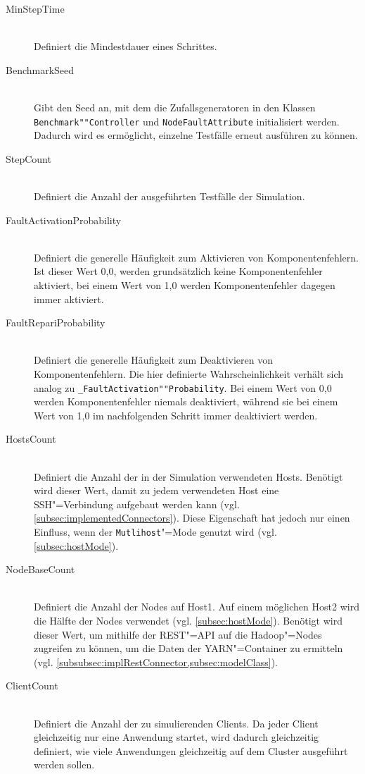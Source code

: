 \begin{description}
    \item [MinStepTime] \hfill \\
        Definiert die Mindestdauer eines Schrittes.
        
    \item[BenchmarkSeed] \hfill \\
        Gibt den Seed an, mit dem die Zufallsgeneratoren in den Klassen \texttt{Benchmark""Controller} und \texttt{NodeFaultAttribute} initialisiert werden.
        Dadurch wird es ermöglicht, einzelne Testfälle erneut ausführen zu können.
        
    \item[StepCount] \hfill \\
        Definiert die Anzahl der ausgeführten Testfälle der Simulation.
        
    \item[FaultActivationProbability] \hfill \\
        Definiert die generelle Häufigkeit zum Aktivieren von Komponentenfehlern.
        Ist dieser Wert 0,0, werden grundsätzlich keine Komponentenfehler aktiviert, bei einem Wert von 1,0 werden Komponentenfehler dagegen immer aktiviert.
        
    \item[FaultRepariProbability] \hfill \\
        Definiert die generelle Häufigkeit zum Deaktivieren von Komponentenfehlern.
        Die hier definierte Wahrscheinlichkeit verhält sich analog zu \texttt{\_FaultActivation""Probability}.
        Bei einem Wert von 0,0 werden Komponentenfehler niemals deaktiviert, während sie bei einem Wert von 1,0 im nachfolgenden Schritt immer deaktiviert werden.
        
    \item[HostsCount] \hfill \\
        Definiert die Anzahl der in der Simulation verwendeten Hosts.
        Benötigt wird dieser Wert, damit zu jedem verwendeten Host eine SSH"=Verbindung aufgebaut werden kann (vgl. \cref{subsec:implementedConnectors}).
        Diese Eigenschaft hat jedoch nur einen Einfluss, wenn der \texttt{Mutlihost}"=Mode genutzt wird (vgl. \cref{subsec:hostMode}).
        
    \item[NodeBaseCount] \hfill \\
        Definiert die Anzahl der Nodes auf Host1.
        Auf einem möglichen Host2 wird die Hälfte der Nodes verwendet (vgl. \cref{subsec:hostMode}).
        Benötigt wird dieser Wert, um mithilfe der REST"=API auf die Hadoop"=Nodes zugreifen zu können, um die Daten der YARN"=Container zu ermitteln (vgl. \cref{subsubsec:implRestConnector,subsec:modelClass}).
        
    \item[ClientCount] \hfill \\
        Definiert die Anzahl der zu simulierenden Clients.
        Da jeder Client gleichzeitig nur eine Anwendung startet, wird dadurch gleichzeitig definiert, wie viele Anwendungen gleichzeitig auf dem Cluster ausgeführt werden sollen.
\end{description}

